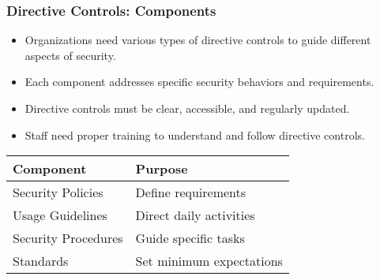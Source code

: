 \documentclass{beamer}
\begin{document}
\begin{frame}
    \frametitle{Directive Controls: Components}
    
    \begin{itemize}
        \item Organizations need various types of directive controls to guide different aspects of security.
        
        \item Each component addresses specific security behaviors and requirements.
        
        \item Directive controls must be clear, accessible, and regularly updated.
        
        \item Staff need proper training to understand and follow directive controls.
    \end{itemize}
    
    \begin{table}
        \begin{tabular}{|l|l|}
            \hline
            \textbf{Component} & \textbf{Purpose} \\
            \hline
            Security Policies & Define requirements \\
            Usage Guidelines & Direct daily activities \\
            Security Procedures & Guide specific tasks \\
            Standards & Set minimum expectations \\
            \hline
        \end{tabular}
    \end{table}
\end{frame}
\end{document}
